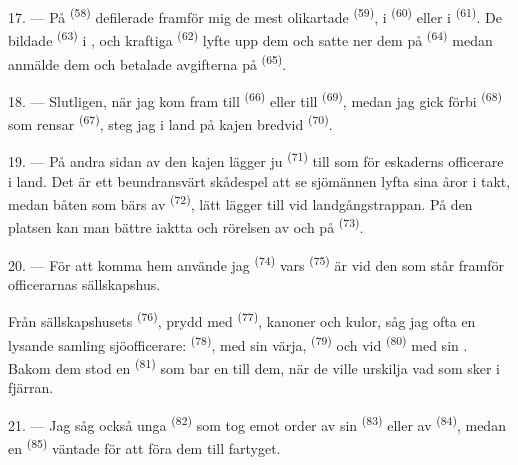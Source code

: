 17. --- På  \textsuperscript{(58)} defilerade framför mig de mest olikartade
 \textsuperscript{(59)}, i  \textsuperscript{(60)} eller i
 \textsuperscript{(61)}. De bildade
 \textsuperscript{(63)} i , och kraftiga
 \textsuperscript{(62)} lyfte upp dem och satte ner dem på
 \textsuperscript{(64)} medan  anmälde dem
och betalade avgifterna på  \textsuperscript{(65)}.

18. --- Slutligen, när jag kom fram till  \textsuperscript{(66)} eller till
 \textsuperscript{(69)}, medan jag gick förbi 
\textsuperscript{(68)} som rensar
 \textsuperscript{(67)}, steg jag i land på kajen bredvid
 \textsuperscript{(70)}.

19. --- På andra sidan av den kajen lägger ju  \textsuperscript{(71)} till
som för eskaderns officerare i land. Det är ett beundransvärt skådespel att se sjömännen lyfta
sina åror i takt, medan båten som bärs av  \textsuperscript{(72)}, lätt lägger
till vid landgångstrappan. På den platsen kan man bättre iaktta  och
rörelsen av  och  på  \textsuperscript{(73)}.

\VUsaut{3.0mm}
\VUsaut{3.0mm}

20. --- För att komma hem använde jag 
\textsuperscript{(74)} vars  \textsuperscript{(75)} är vid den
 som står framför officerarnas sällskapshus.

Från sällskapshusets  \textsuperscript{(76)}, prydd med
 \textsuperscript{(77)}, kanoner och kulor, såg jag ofta en
lysande samling sjöofficerare:  \textsuperscript{(78)}, med sin värja,
 \textsuperscript{(79)} och vid
 \textsuperscript{(80)} med sin . Bakom dem
stod en  \textsuperscript{(81)} som bar en  till dem, när de
ville urskilja vad som sker i fjärran.

21. --- Jag såg också unga  \textsuperscript{(82)} som tog emot order
av sin  \textsuperscript{(83)} eller av
 \textsuperscript{(84)}, medan en 
\textsuperscript{(85)} väntade för att föra dem till fartyget.

